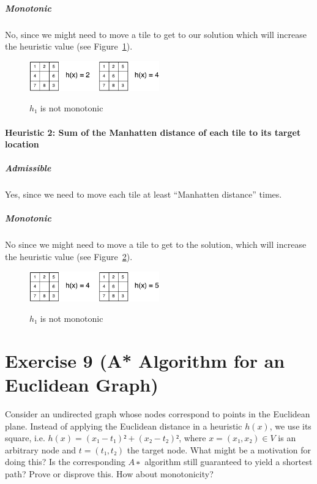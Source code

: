\documentclass[a4paper, 12pt]{report}
\begin{document}
\subparagraph{Monotonic}

No, since we might need to move a tile to get to our solution which will
increase the heuristic value (see
Figure~\ref{figure:Exercise_2_8_h1_Monotonicity}).

\begin{figure}[htbp]
    \caption{$h₁$ is not monotonic}
    \vskip 0.2cm
    \centering
    \includegraphics[width=0.5\textwidth]{Figures/Exercise_2_8_h1_Monotonicity}
    \label{figure:Exercise_2_8_h1_Monotonicity}
\end{figure}

\paragraph{Heuristic 2: Sum of the Manhatten distance of each tile to its
target location}

\subparagraph{Admissible}

Yes, since we need to move each tile at least “Manhatten distance” times.

\subparagraph{Monotonic}

No since we might need to move a tile to get to the solution, which will
increase the heuristic value (see
Figure~\ref{figure:Exercise_2_8_h2_Monotonicity}).

\begin{figure}[htbp]
    \caption{$h₁$ is not monotonic}
    \vskip 0.2cm
    \centering
    \includegraphics[width=0.5\textwidth]{Figures/Exercise_2_8_h2_Monotonicity}
    \label{figure:Exercise_2_8_h2_Monotonicity}
\end{figure}

\section{Exercise 9 (A* Algorithm for an Euclidean Graph)}

Consider an undirected graph whose nodes correspond to points in the Euclidean
plane. Instead of applying the Euclidean distance in a heuristic $h(x)$, we use
its square, i.e. $h(x) = (x₁ − t₁)² + (x₂ − t₂)²$, where $x = (x₁, x₂) ∈ V$ is
an arbitrary node and $t = (t₁, t₂)$ the target node. What might be a
motivation for doing this? Is the corresponding $A∗$ algorithm still guaranteed
to yield a shortest path? Prove or disprove this. How about monotonicity?
\end{document}

